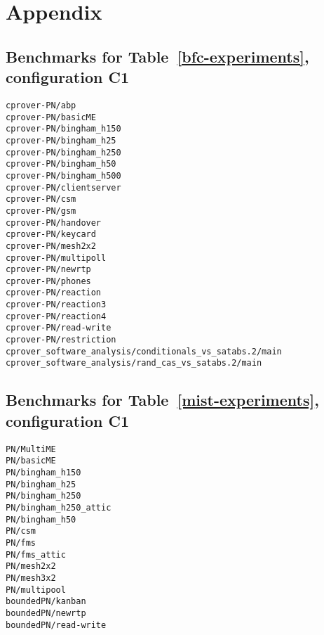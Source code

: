 \documentclass{article}
\begin{document}
\section*{Appendix}

\subsection{Benchmarks for Table~\ref{bfc-experiments}, configuration C1}
\label{bfc-experiments-c1}

\begin{verbatim}
cprover-PN/abp
cprover-PN/basicME
cprover-PN/bingham_h150
cprover-PN/bingham_h25
cprover-PN/bingham_h250
cprover-PN/bingham_h50
cprover-PN/bingham_h500
cprover-PN/clientserver
cprover-PN/csm
cprover-PN/gsm
cprover-PN/handover
cprover-PN/keycard
cprover-PN/mesh2x2
cprover-PN/multipoll
cprover-PN/newrtp
cprover-PN/phones
cprover-PN/reaction
cprover-PN/reaction3
cprover-PN/reaction4
cprover-PN/read-write
cprover-PN/restriction
cprover_software_analysis/conditionals_vs_satabs.2/main
cprover_software_analysis/rand_cas_vs_satabs.2/main
\end{verbatim}




\subsection{Benchmarks for Table~\ref{mist-experiments}, configuration C1}
\label{mist-experiments-c1}

\begin{verbatim}
PN/MultiME
PN/basicME
PN/bingham_h150
PN/bingham_h25
PN/bingham_h250
PN/bingham_h250_attic
PN/bingham_h50
PN/csm
PN/fms
PN/fms_attic
PN/mesh2x2
PN/mesh3x2
PN/multipool
boundedPN/kanban
boundedPN/newrtp
boundedPN/read-write
\end{verbatim}
\end{document}
